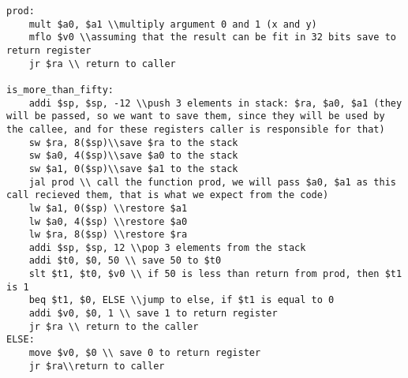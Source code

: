 \documentclass[a4paper]{article}
\begin{document}
\begin{lstlisting}
prod:
	mult $a0, $a1 \\multiply argument 0 and 1 (x and y)
	mflo $v0 \\assuming that the result can be fit in 32 bits save to return register
	jr $ra \\ return to caller
	
is_more_than_fifty:
	addi $sp, $sp, -12 \\push 3 elements in stack: $ra, $a0, $a1 (they will be passed, so we want to save them, since they will be used by the callee, and for these registers caller is responsible for that)
	sw $ra, 8($sp)\\save $ra to the stack
	sw $a0, 4($sp)\\save $a0 to the stack
	sw $a1, 0($sp)\\save $a1 to the stack
	jal prod \\ call the function prod, we will pass $a0, $a1 as this call recieved them, that is what we expect from the code)
	lw $a1, 0($sp) \\restore $a1
	lw $a0, 4($sp) \\restore $a0
	lw $ra, 8($sp) \\restore $ra
	addi $sp, $sp, 12 \\pop 3 elements from the stack
	addi $t0, $0, 50 \\ save 50 to $t0
	slt $t1, $t0, $v0 \\ if 50 is less than return from prod, then $t1 is 1
	beq $t1, $0, ELSE \\jump to else, if $t1 is equal to 0
	addi $v0, $0, 1 \\ save 1 to return register
	jr $ra \\ return to the caller
ELSE:
	move $v0, $0 \\ save 0 to return register
	jr $ra\\return to caller
\end{lstlisting}
\end{document}
